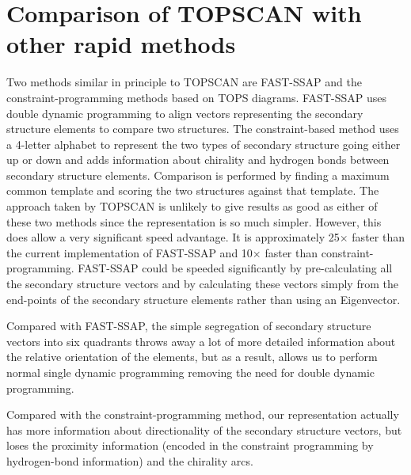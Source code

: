 \documentclass{article}
\begin{document}

\section{Comparison of TOPSCAN with other rapid methods}
Two methods similar in principle to TOPSCAN are FAST-SSAP and the
constraint-programming methods based on TOPS
diagrams\cite{David_Gilbert_David_Westhead}.  FAST-SSAP uses
double dynamic programming to align vectors representing the secondary
structure elements to compare two structures. The constraint-based
method uses a 4-letter alphabet to represent the two types of
secondary structure going either up or down and adds information about
chirality and hydrogen bonds between secondary structure elements.
Comparison is performed by finding a maximum common template and
scoring the two structures against that template.  The approach taken
by TOPSCAN is unlikely to give results as good as either of these two
methods since the representation is so much simpler. However, this
does allow a very significant speed advantage. It is approximately
25$\times$ faster than the current implementation of FAST-SSAP and
10$\times$ faster than constraint-programming.  FAST-SSAP could be
speeded significantly by pre-calculating all the secondary structure
vectors and by calculating these vectors simply from the end-points of
the secondary structure elements rather than using an Eigenvector.


Compared with FAST-SSAP, the simple segregation of secondary structure
vectors into six quadrants throws away a lot of more detailed
information about the relative orientation of the elements, but as a
result, allows us to perform normal single dynamic programming
removing the need for double dynamic programming.

Compared with the constraint-programming method, our representation
actually has more information about directionality of the secondary
structure vectors, but loses the proximity information (encoded in the
constraint programming by hydrogen-bond information) and the chirality
arcs. 
\end{document}
